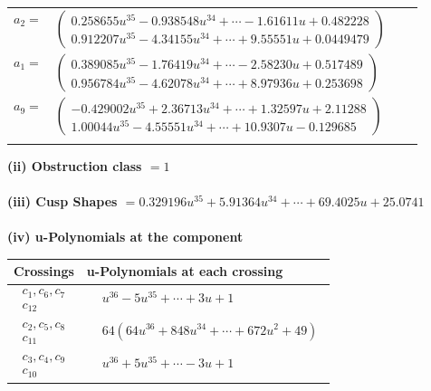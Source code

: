 \documentclass[1p]{elsarticle_modified}
\theoremstyle{definition}
\begin{document}
\begin{tabular}{m{7pt} m{180pt} m{7pt} m{180pt} }
\flushright $a_{2}=$&$\begin{pmatrix}0.258655 u^{35}-0.938548 u^{34}+\cdots-1.61611 u+0.482228\\0.912207 u^{35}-4.34155 u^{34}+\cdots+9.55551 u+0.0449479\end{pmatrix}$ \\
\flushright $a_{1}=$&$\begin{pmatrix}0.389085 u^{35}-1.76419 u^{34}+\cdots-2.58230 u+0.517489\\0.956784 u^{35}-4.62078 u^{34}+\cdots+8.97936 u+0.253698\end{pmatrix}$ \\
\flushright $a_{9}=$&$\begin{pmatrix}-0.429002 u^{35}+2.36713 u^{34}+\cdots+1.32597 u+2.11288\\1.00044 u^{35}-4.55551 u^{34}+\cdots+10.9307 u-0.129685\end{pmatrix}$\\&\end{tabular}
\flushleft \textbf{(ii) Obstruction class $= 1$}\\~\\
\flushleft \textbf{(iii) Cusp Shapes $= 0.329196 u^{35}+5.91364 u^{34}+\cdots+69.4025 u+25.0741$}\\~\\
\newpage\renewcommand{\arraystretch}{1}
\flushleft \textbf{(iv) u-Polynomials at the component}\newline \\
\begin{tabular}{m{50pt}|m{274pt}}
Crossings & \hspace{64pt}u-Polynomials at each crossing \\
\hline $$\begin{aligned}c_{1},c_{6},c_{7}\\c_{12}\end{aligned}$$&$\begin{aligned}
&u^{36}-5 u^{35}+\cdots+3 u+1
\end{aligned}$\\
\hline $$\begin{aligned}c_{2},c_{5},c_{8}\\c_{11}\end{aligned}$$&$\begin{aligned}
&64(64 u^{36}+848 u^{34}+\cdots+672 u^2+49)
\end{aligned}$\\
\hline $$\begin{aligned}c_{3},c_{4},c_{9}\\c_{10}\end{aligned}$$&$\begin{aligned}
&u^{36}+5 u^{35}+\cdots-3 u+1
\end{aligned}$\\
\hline
\end{tabular}\\~\\
\end{document}
